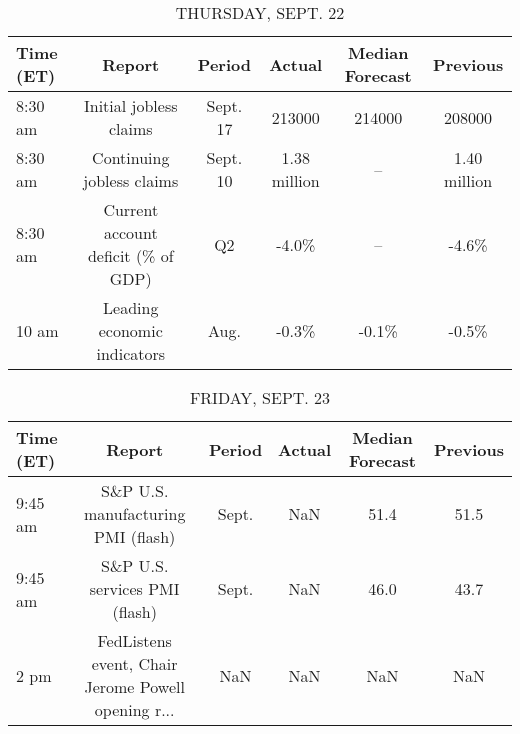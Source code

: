 \documentclass{article}%
\begin{document}
%


\begin{table}[htbp]%
\caption{THURSDAY, SEPT. 22}%
\centering%
\begin{adjustbox}{width=1\textwidth}%
\begin{tabular}{lccccc}
\toprule
Time (ET) &                             Report &   Period &       Actual & Median Forecast &     Previous \\
\midrule
  8:30 am &             Initial jobless claims & Sept. 17 &       213000 &          214000 &       208000 \\
  8:30 am &          Continuing jobless claims & Sept. 10 & 1.38 million &              -- & 1.40 million \\
  8:30 am & Current account deficit (\% of GDP) &       Q2 &        -4.0\% &              -- &        -4.6\% \\
    10 am &        Leading economic indicators &     Aug. &        -0.3\% &           -0.1\% &        -0.5\% \\
\bottomrule
\end{tabular}
%
\end{adjustbox}%
\end{table}

%


\begin{table}[htbp]%
\caption{FRIDAY, SEPT. 23}%
\centering%
\begin{adjustbox}{width=1\textwidth}%
\begin{tabular}{lccccc}
\toprule
Time (ET) &                                             Report & Period & Actual & Median Forecast & Previous \\
\midrule
  9:45 am &                 S\&P U.S. manufacturing PMI (flash) &  Sept. &    NaN &            51.4 &     51.5 \\
  9:45 am &                      S\&P U.S. services PMI (flash) &  Sept. &    NaN &            46.0 &     43.7 \\
     2 pm & FedListens event, Chair Jerome Powell opening r... &    NaN &    NaN &             NaN &      NaN \\
\bottomrule
\end{tabular}
%
\end{adjustbox}%
\end{table}

%
\end{document}
